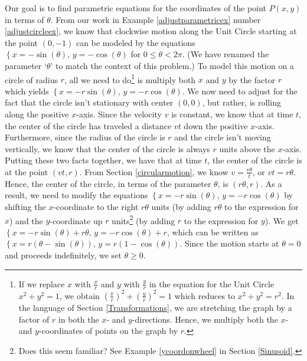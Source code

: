 Our goal is to find parametric equations for the coordinates of the point $P(x,y)$ in terms of $\theta$.  From our work in Example \ref{adjustparametricex} number \ref{adjustcircleex}, we know that clockwise motion along the Unit Circle starting at the point $(0,-1)$ can be modeled by the equations  $\left\{ x = -\sin(\theta), \, y = -\cos(\theta) \right.$ for $0 \leq \theta < 2\pi$.  (We have renamed the parameter `$\theta$' to match the context of this problem.) To model this motion on a circle of radius $r$, all we need to do\footnote{If we replace $x$ with $\frac{x}{r}$ and $y$ with $\frac{y}{r}$ in the equation for the Unit Circle $x^2+y^2 = 1$, we obtain $\left(\frac{x}{r}\right)^2 + \left(\frac{y}{r}\right)^2 = 1$ which reduces to $x^2 + y^2 = r^2$.  In the language of Section \ref{Transformations}, we are stretching the graph by a factor of $r$ in both the $x$- and $y$-directions. Hence,  we multiply both the $x$- and $y$-coordinates of points on the graph by $r$.} is multiply both $x$ and $y$ by the factor $r$ which yields $\left\{ x = -r\sin(\theta), \, y = -r\cos(\theta) \right.$.  We now need to adjust for the fact that the circle isn't stationary with center $(0,0)$, but rather, is rolling along the positive $x$-axis.  Since the velocity $v$ is constant, we know that at time $t$, the center of the circle has traveled a distance $vt$ down the positive $x$-axis.  Furthermore, since the radius of the circle is $r$ and the circle isn't moving vertically, we know that the center of the circle is always $r$ units above the $x$-axis.  Putting these two facts together, we have that at time $t$, the center of the circle is at the point $(vt,r)$. From Section \ref{circularmotion}, we know $v = \frac{r \theta}{t}$, or $vt = r\theta$.  Hence, the center of the circle, in terms of the parameter $\theta$, is $(r\theta,r)$. As a result, we need to modify the equations $\left\{ x = -r\sin(\theta), \, y = -r\cos(\theta) \right.$  by shifting the $x$-coordinate to the right $r\theta$ units (by adding $r\theta$ to the expression for $x$) and the $y$-coordinate up $r$ units\footnote{Does this seem familiar?  See Example \ref{ycoordonwheel} in Section \ref{Sinusoid}.} (by adding $r$ to the expression for $y$).  We get $\left\{ x = -r\sin(\theta)+ r\theta, \, y = -r\cos(\theta) + r \right.$, which can be written as $\left\{ x = r(\theta -\sin(\theta)), \, y = r(1-\cos(\theta)) \right.$. Since the motion starts at $\theta = 0$ and proceeds indefinitely, we set  $\theta \geq 0$.  

\smallskip

